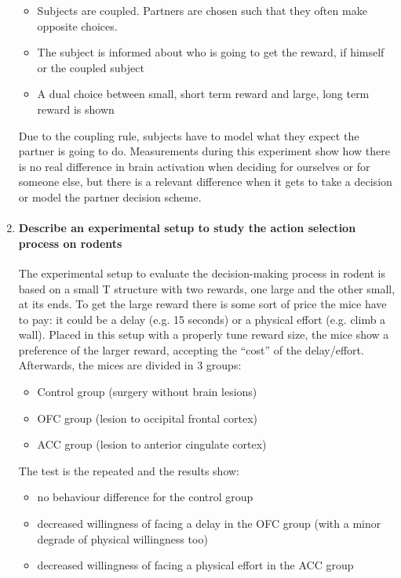 \documentclass[12pt,article,oneside,a4paper]{memoir}
\begin{document}
\begin{enumerate}
\begin{itemize}
\item Subjects are coupled. Partners are chosen such that they often make
opposite choices.
\item The subject is informed about who is going to get the reward, if himself
or the coupled subject
\item A dual choice between small, short term reward and large, long term
reward is shown
\end{itemize}

Due to the coupling rule, subjects have to model what they expect the partner
is going to do. Measurements during this experiment show how there is no real
difference in brain activation when deciding for ourselves or for someone else,
but there is a relevant difference when it gets to take a decision or model the
partner decision scheme.

\item \paragraph{Describe an experimental setup to study the action selection
process on rodents}

The experimental setup to evaluate the decision-making process in rodent is
based on a small T structure with two rewards, one large and the other small,
at its ends.
To get the large reward there is some sort of price the mice have to pay: it
could be a delay (e.g. 15 seconds) or a physical effort (e.g. climb a wall).
Placed in this setup with a properly tune reward size, the mice show a
preference of the larger reward, accepting the ``cost'' of the delay/effort.
Afterwards, the mices are divided in 3 groups:

\begin{itemize}
\item Control group (surgery without brain lesions)
\item OFC group (lesion to occipital frontal cortex)
\item ACC group (lesion to anterior cingulate cortex)
\end{itemize}

The test is the repeated and the results show:

\begin{itemize}
\item no behaviour difference for the control group
\item decreased willingness of facing a delay in the OFC group (with a minor
degrade of physical willingness too)
\item decreased willingness of facing a physical effort in the ACC group
\end{itemize}


\end{enumerate}
\end{document}
